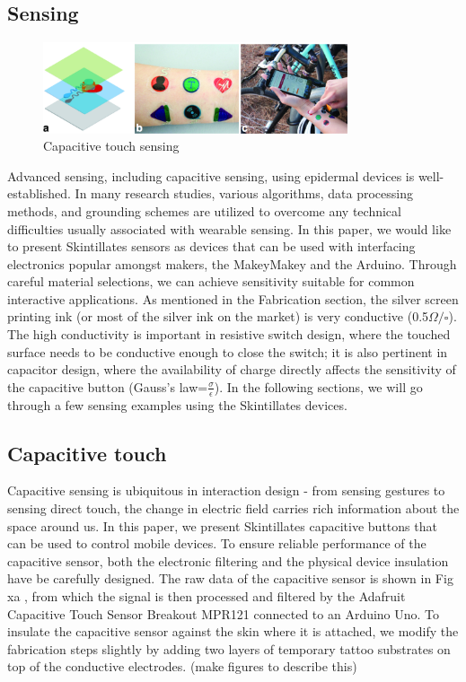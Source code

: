 \documentclass{sigchi}
\begin{document}
\subsection{Sensing}
\begin{figure}[!h]
\centering
\includegraphics[width=0.8\textwidth]{figures/Figure7}
\caption{Capacitive touch sensing}
\label{fig:figure7}
\end{figure}
Advanced sensing, including capacitive sensing, using epidermal devices is well-established. In many research studies, various algorithms, data processing methods, and grounding schemes are utilized to overcome any technical difficulties usually associated with wearable sensing. In this paper, we would like to present Skintillates sensors as devices that can be used with interfacing electronics popular amongst makers, the MakeyMakey and the Arduino. Through careful material selections, we can achieve sensitivity suitable for common interactive applications. As mentioned in the Fabrication section, the silver screen printing ink (or most of the silver ink on the market) is very conductive (0.5$\Omega/\square$). %
 The high conductivity is important in resistive switch design, where the touched surface needs to be conductive enough to close the switch; it is also pertinent in capacitor design, where the availability of charge directly affects the sensitivity of the capacitive button (Gauss’s law=$\frac{\sigma}{\epsilon}$). In the following sections, we will go through a few sensing examples using the Skintillates devices. 

\subsection {Capacitive touch}

Capacitive sensing is ubiquitous in interaction design - from sensing gestures to sensing direct touch, %
the change in electric field carries rich information about the space around us. In this paper, we present Skintillates capacitive buttons that can be used to control mobile devices. To ensure reliable performance of the capacitive sensor, both the electronic filtering and the physical device insulation have be carefully designed. The raw data of the capacitive sensor is shown in Fig xa %
, from which the signal is then processed and filtered by the Adafruit Capacitive Touch Sensor Breakout MPR121 connected to an Arduino Uno. To insulate the capacitive sensor against the skin where it is attached, we modify the fabrication steps slightly by adding two layers of temporary tattoo substrates on top of the conductive electrodes. (make figures to describe this)
\end{document}
